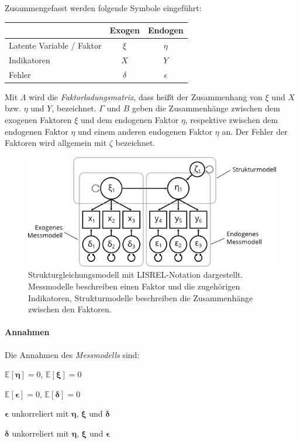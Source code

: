 \documentclass{article}
\numberwithin{equation}{section}
\begin{document}
Zusammengefasst werden folgende Symbole eingeführt:

\begin{tabular}{l|cc}
& Exogen & Endogen\\
\hline
Latente Variable / Faktor & $\xi$ & $\eta$\\
Indikatoren & $X$ & $Y$\\
Fehler & $\delta$ & $\epsilon$\\
\end{tabular}

Mit $\Lambda$ wird die \emph{Faktorladungsmatrix}, dass heißt der Zusammenhang von $\xi$ und $X$ bzw. $\eta$ und $Y$, bezeichnet. $\Gamma$ und $B$ geben die Zusammenhänge zwischen dem exogenen Faktoren $\xi$ und dem endogenen Faktor $\eta$, respektive zwischen dem endogenen Faktor $\eta$ und einem anderen endogenen Faktor $\eta$ an. Der Fehler der Faktoren wird allgemein mit $\zeta$ bezeichnet.

\begin{figure}
  \centering
  \includegraphics{images/sem.png}
  \caption{Strukturgleichungsmodell mit LISREL-Notation dargestellt. Messmodelle beschreiben einen Faktor und die zugehörigen Indikatoren, Strukturmodelle beschreiben die Zusammenhänge zwischen den Faktoren.}
  \label{img:sem}
\end{figure}

\paragraph*{Annahmen}

Die Annahmen des \emph{Messmodells} sind:

\begin{compactitem}
\item $\mathbb{E} [\boldsymbol\eta] = 0$, $\mathbb{E} [\boldsymbol\xi] = 0$
\item $\mathbb{E} [\boldsymbol\epsilon] = 0$, $\mathbb{E} [\boldsymbol\delta] = 0$
\item $\boldsymbol\epsilon$ unkorreliert mit $\boldsymbol\eta$, $\boldsymbol\xi$ und $\boldsymbol\delta$
\item $\boldsymbol\delta$ unkorreliert mit $\boldsymbol\eta$, $\boldsymbol\xi$ und $\boldsymbol\epsilon$
\end{compactitem}
\end{document}
